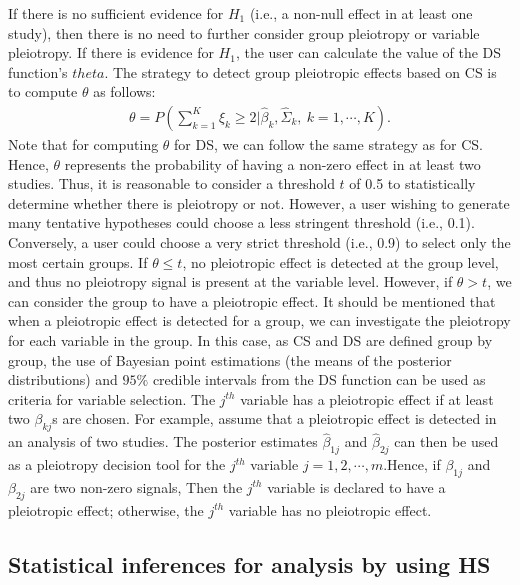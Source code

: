 If there is no sufficient evidence for \(H_1\) (i.e., a non-null effect in at least one study), then there is no need to further consider group pleiotropy or variable pleiotropy.
If there is evidence for \(H_1\), the user can calculate the value of the DS function's \(theta\). The strategy to detect group pleiotropic effects based on CS is to compute \(\theta\) as follows:
\begin{eqnarray}\label{theta}
 \theta=P\left(\sum_{k=1}^{K} \xi_k\geq 2 | \hat{\beta}_k, \hat{\Sigma}_k,~k=1,\cdots,K\right).
\end{eqnarray}
Note that for computing \(\theta\) for DS, we can follow the same strategy as for CS. Hence, \(\theta\) represents the probability of having a non-zero effect in at least two studies.
Thus, it is reasonable to consider a threshold \(t\) of 0.5 to statistically determine whether there is pleiotropy or not. However, a user wishing to generate many tentative hypotheses could choose a less stringent threshold (i.e., 0.1).
Conversely, a user could choose a very strict threshold (i.e., 0.9) to select only the most certain groups.
If \(\theta \leq t\), no pleiotropic effect is detected at the group level, and thus no pleiotropy signal is present at the variable level.
However, if \(\theta> t\), we can consider the group to have a pleiotropic effect.
It should be mentioned that when a pleiotropic effect is detected for a group, we can investigate the pleiotropy for each variable in the group.
In this case, as CS and DS are defined group by group, the use of Bayesian point estimations (the means of the posterior distributions) and \(95\%\) credible intervals from the DS function can be used as criteria for variable selection.
The \(j^{th}\) variable has a pleiotropic effect if at least two \(\beta_{kj}\)s are chosen. For example, assume that a pleiotropic effect is detected in an analysis of two studies.
The posterior estimates \(\hat{\beta}_{1j}\) and \(\hat{\beta}_{2j}\) can then be used as a pleiotropy decision tool for the \(j^{th}\) variable \(j=1,2,\cdots,m\).Hence, if \(\beta_{1j}\) and \(\beta_{2j}\) are two non-zero signals,
Then the \(j^{th}\) variable is declared to have a pleiotropic effect; otherwise, the \(j^{th}\) variable has no pleiotropic effect.

\hypertarget{statistical-inferences-for-analysis-by-using-hs}{%
\subsection{Statistical inferences for analysis by using HS}\label{statistical-inferences-for-analysis-by-using-hs}}

